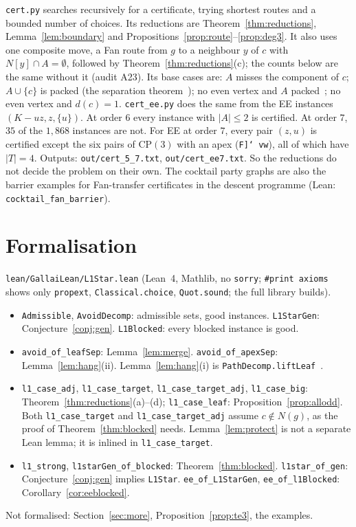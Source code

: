 \documentclass[11pt]{amsart}
\theoremstyle{definition}
\begin{document}
\texttt{cert.py} searches recursively for a certificate, trying shortest routes and a bounded
number of choices. Its reductions are Theorem~\ref{thm:reductions}, Lemma~\ref{lem:boundary} and
Propositions~\ref{prop:route}--\ref{prop:deg3}. It also uses one composite move, a Fan route from $g$
to a neighbour $y$ of $c$ with $N[y]\cap A=\emptyset$, followed by Theorem~\ref{thm:reductions}(c);
the counts below are the same without it (audit A23). Its base cases are: $A$ misses the component of
$c$; $A\cup\{c\}$ is packed (the separation theorem~\cite[Theorem~6.1]{RD}); no even vertex and $A$
packed~\cite[Theorem~6.3]{RD}; no even vertex and $d(c)=1$. \texttt{cert\_ee.py} does the same from
the EE instances $(K-uz,z,\{u\})$. At order $6$ every instance with $|A|\le2$ is certified. At order $7$,
$35$ of the $1{,}868$ instances are not. For EE at order $7$, every pair $(z,u)$ is certified except
the six pairs of $\mathrm{CP}(3)$ with an apex (\texttt{F]\char`~vw}), all of which have $|T|=4$.
Outputs: \texttt{out/cert\_5\_7.txt}, \texttt{out/cert\_ee7.txt}. So the reductions do not decide
the problem on their own. The cocktail party graphs are also the barrier examples for Fan-transfer
certificates in the descent programme (Lean: \texttt{cocktail\_fan\_barrier}).

\section{Formalisation}\label{sec:lean}

\texttt{lean/GallaiLean/L1Star.lean} (Lean~4, Mathlib, no \texttt{sorry}; \texttt{\#print axioms}
shows only \texttt{propext}, \texttt{Classical.choice}, \texttt{Quot.sound}; the full library
builds).
\begin{itemize}
\item \texttt{Admissible}, \texttt{AvoidDecomp}: admissible sets, good instances.
\texttt{L1StarGen}: Conjecture~\ref{conj:gen}. \texttt{L1Blocked}: every blocked instance is good.
\item \texttt{avoid\_of\_leafSep}: Lemma~\ref{lem:merge}. \texttt{avoid\_of\_apexSep}:
Lemma~\ref{lem:hang}(ii). Lemma~\ref{lem:hang}(i) is \texttt{PathDecomp.liftLeaf}~\cite{PE}.
\item \texttt{l1\_case\_adj}, \texttt{l1\_case\_target}, \texttt{l1\_case\_target\_adj},
\texttt{l1\_case\_big}: Theorem~\ref{thm:reductions}(a)--(d); \texttt{l1\_case\_leaf}:
Proposition~\ref{prop:allodd}. Both \texttt{l1\_case\_target} and \texttt{l1\_case\_target\_adj}
assume $c\notin N(g)$, as the proof of Theorem~\ref{thm:blocked} needs. Lemma~\ref{lem:protect} is
not a separate Lean lemma; it is inlined in \texttt{l1\_case\_target}.
\item \texttt{l1\_strong}, \texttt{l1starGen\_of\_blocked}: Theorem~\ref{thm:blocked}.
\texttt{l1star\_of\_gen}: Conjecture~\ref{conj:gen} implies \texttt{L1Star}.
\texttt{ee\_of\_L1StarGen}, \texttt{ee\_of\_l1Blocked}: Corollary~\ref{cor:eeblocked}.
\end{itemize}
Not formalised: Section~\ref{sec:more}, Proposition~\ref{prop:te3}, the examples.
\end{document}
